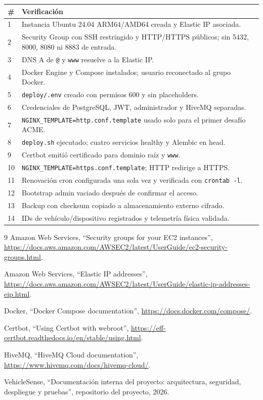 \documentclass[12pt,a4paper,oneside]{report}
\newcommand{\code}[1]{\texttt{\small #1}}
\begin{document}
\begin{longtable}{p{} p{}}
\toprule
\# & Verificación \\
\midrule
1 & Instancia Ubuntu 24.04 ARM64/AMD64 creada y Elastic IP asociada. \\
2 & Security Group con SSH restringido y HTTP/HTTPS públicos; sin 5432, 8000, 8080 ni 8883 de entrada. \\
3 & DNS A de \code{@} y \code{www} resuelve a la Elastic IP. \\
4 & Docker Engine y Compose instalados; usuario reconectado al grupo Docker. \\
5 & \code{deploy/.env} creado con permisos 600 y sin placeholders. \\
6 & Credenciales de PostgreSQL, JWT, administrador y HiveMQ separadas. \\
7 & \code{NGINX\_TEMPLATE=http.conf.template} usado solo para el primer desafío ACME. \\
8 & \code{deploy.sh} ejecutado; cuatro servicios healthy y Alembic en head. \\
9 & Certbot emitió certificado para dominio raíz y \code{www}. \\
10 & \code{NGINX\_TEMPLATE=https.conf.template}; HTTP redirige a HTTPS. \\
11 & Renovación cron configurada una sola vez y verificada con \code{crontab -l}. \\
12 & Bootstrap admin vaciado después de confirmar el acceso. \\
13 & Backup con checksum copiado a almacenamiento externo cifrado. \\
14 & IDs de vehículo/dispositivo registrados y telemetría física validada. \\
\bottomrule
\end{longtable}

\renewcommand{\bibname}{Referencias}

\begin{thebibliography}{9}
Amazon Web Services, ``Security groups for your EC2 instances'',
\url{https://docs.aws.amazon.com/AWSEC2/latest/UserGuide/ec2-security-groups.html}.

Amazon Web Services, ``Elastic IP addresses'',
\url{https://docs.aws.amazon.com/AWSEC2/latest/UserGuide/elastic-ip-addresses-eip.html}.

Docker, ``Docker Compose documentation'',
\url{https://docs.docker.com/compose/}.

Certbot, ``Using Certbot with webroot'',
\url{https://eff-certbot.readthedocs.io/en/stable/using.html}.

HiveMQ, ``HiveMQ Cloud documentation'',
\url{https://www.hivemq.com/docs/hivemq-cloud/}.

VehicleSense, ``Documentación interna del proyecto: arquitectura, seguridad,
despliegue y pruebas'', repositorio del proyecto, 2026.
\end{thebibliography}
\end{document}
